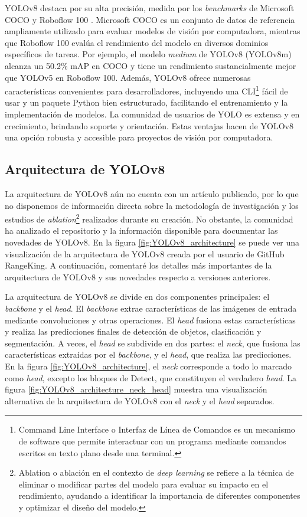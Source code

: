 YOLOv8 destaca por su alta precisión, medida por los \textit{benchmarks} de Microsoft COCO \cite{COCO} y Roboflow 100 \cite{Roboflow100}. Microsoft COCO es un conjunto de datos de referencia ampliamente utilizado para evaluar modelos de visión por computadora, mientras que Roboflow 100 evalúa el rendimiento del modelo en diversos dominios específicos de tareas. Por ejemplo, el modelo \textit{medium} de YOLOv8 (YOLOv8m) alcanza un 50.2\% mAP en COCO y tiene un rendimiento sustancialmente mejor que YOLOv5 en Roboflow 100. Además, YOLOv8 ofrece numerosas características convenientes para desarrolladores, incluyendo una CLI\footnote{Command Line Interface o Interfaz de Línea de Comandos es un mecanismo de software que permite interactuar con un programa mediante comandos escritos en texto plano desde una terminal.} fácil de usar y un paquete Python bien estructurado, facilitando el entrenamiento y la implementación de modelos. La comunidad de usuarios de YOLO es extensa y en crecimiento, brindando soporte y orientación. Estas ventajas hacen de YOLOv8 una opción robusta y accesible para proyectos de visión por computadora.

\subsection{Arquitectura de YOLOv8}
La arquitectura de YOLOv8 aún no cuenta con un artículo publicado, por lo que no disponemos de información directa sobre la metodología de investigación y los estudios de \textit{ablation}\footnote{Ablation o ablación en el contexto de \textit{deep learning} se refiere a la técnica de eliminar o modificar partes del modelo para evaluar su impacto en el rendimiento, ayudando a identificar la importancia de diferentes componentes y optimizar el diseño del modelo.} realizados durante su creación. No obstante, la comunidad ha analizado el repositorio y la información disponible para documentar las novedades de YOLOv8. En la figura \ref{fig:YOLOv8_architecture} se puede ver una visualización de la arquitectura de YOLOv8 creada por el usuario de GitHub RangeKing\cite{RangeKing_GitHub}. A continuación, comentaré los detalles más importantes de la arquitectura de YOLOv8 y sus novedades respecto a versiones anteriores. \cite{whats-new-in-yolov8} \cite{yolov8-architecture-blog} \cite{yolov8-architecture-blog2}

La arquitectura de YOLOv8 se divide en dos componentes principales: el \textit{backbone} y el \textit{head}. El \textit{backbone} extrae características de las imágenes de entrada mediante convoluciones y otras operaciones. El \textit{head} fusiona estas características y realiza las predicciones finales de detección de objetos, clasificación y segmentación. A veces, el \textit{head} se subdivide en dos partes: el \textit{neck}, que fusiona las características extraídas por el \textit{backbone}, y el \textit{head}, que realiza las predicciones. En la figura \ref{fig:YOLOv8_architecture}, el \textit{neck} corresponde a todo lo marcado como \textit{head}, excepto los bloques de Detect, que constituyen el verdadero \textit{head}. La figura \ref{fig:YOLOv8_architecture_neck_head} muestra una visualización alternativa de la arquitectura de YOLOv8 con el \textit{neck} y el \textit{head} separados.

